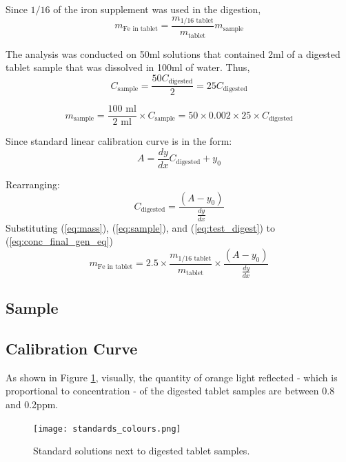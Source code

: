 \documentclass[main.tex]{subfiles}
\begin{document}
Since $1/16$ of the iron supplement was used in the digestion,
\begin{equation}
    m_{\text{Fe in tablet}} = \frac{m_{1/16 \text{ tablet}}}{m_{\text{tablet}}}m_{\text{sample}}
    \label{eq:mass}
\end{equation}

The analysis was conducted on 50ml solutions that contained 2ml of a digested tablet sample that was dissolved in 100ml of water. Thus,
\begin{equation}
    C_{\text{sample}} = \frac{50 C_{\text{digested}}}{2}
    = 25C_{\text{digested}}
    \label{eq:test_digest}
\end{equation}

\begin{equation}
    m_{\text{sample}} = \frac{100\text{ ml}}{2\text{ ml}}  \times C_{\text{sample}} = 50 \times 0.002 \times 25 \times C_{\text{digested}}
    \label{eq:sample}
\end{equation}



Since standard linear calibration curve is in the form:
\begin{equation*}
    A = \frac{dy}{dx}C_{\text{digested}} + y_0
    \label{eq:cal_nosub}
\end{equation*}

Rearranging:
\begin{equation}
    C_{\text{digested}} = \frac{(A-y_0)}{\frac{dy}{dx}}
    \label{eq:conc_final_gen_eq}
\end{equation}
Substituting (\ref{eq:mass}), (\ref{eq:sample}), and (\ref{eq:test_digest}) to (\ref{eq:conc_final_gen_eq})
\begin{equation}
    m_{\text{Fe in tablet}} = 2.5 \times \frac{m_{1/16 \text{ tablet}}}{m_{\text{tablet}}} \times\frac{(A-y_0)}{\frac{dy}{dx}}
    \label{eq:mega}
\end{equation}



\subsection*{Sample}



\subsection*{Calibration Curve}
As shown in Figure \ref{fig:colours}, visually, the quantity of orange light reflected - which is proportional to concentration - of the digested tablet samples are between 0.8 and 0.2ppm.
\begin{figure}[H]
    \centering
    \texttt{[image: standards\_colours.png]}
    \caption{Standard solutions next to digested tablet samples.}
    \label{fig:colours}
\end{figure}
\end{document}
